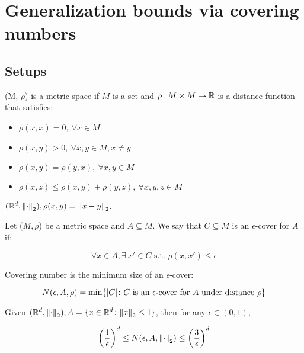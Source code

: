 
\chapter{Generalization bounds via covering numbers}


\section{Setups}

\begin{definition} 

    (M, \(\rho\)) is a metric space if \(M\) is a set and \(\rho \colon M \times M \to \mathbb{R}\)
    is a distance function that satisfies: 

    \begin{itemize}
        \item \(\rho (x, x) = 0, \ \forall x \in M\). 
        \item \(\rho (x, y) > 0, \ \forall x, y \in M, x \neq y\)
        \item \(\rho (x, y) = \rho (y, x), \ \forall x,y \in M\)
        \item \(\rho (x, z) \leq \rho(x, y) + \rho (y, z), \ \forall x, y, z \in M\)
    \end{itemize}
    
\end{definition}

\begin{eg}
    \((\mathbb{R}^d, \norm{\cdot}_2), \rho (x, y) = \norm{x - y}_2\). 
\end{eg}


\begin{definition}
    Let (\(M, \rho\)) be a metric space and \(A \subseteq M\). We say that \(C \subseteq M\)
    is an \(\epsilon\)-cover for \(A\) if: 
    
    \[
        \forall x \in A, \exists \ x' \in C \text{ s.t. } \rho(x, x') \leq \epsilon  
    \]
\end{definition}


\begin{definition}
    Covering number is the minimum size of an \(\epsilon\)-cover: 
    
    \[
        N (\epsilon, A, \rho) = \min \{ \lvert C \rvert \colon C \text{ is an } \epsilon \text{-cover 
        for } A \text{ under distance } \rho  \}  
    \]
\end{definition}


\begin{eg}
    Given \((\mathbb{R}^d, \norm{\cdot}_2), A = \{  x \in \mathbb{R}^d \colon \norm{x}_2 \leq 1 \}\),  
    then for any \(\epsilon \in (0, 1)\), 

    \[
        \left( \frac{1}{\epsilon}\right)^d \leq N ( \epsilon, A, \norm{\cdot}_2) \leq 
        \left(\frac{3}{\epsilon}\right)^d   
    \]
\end{eg}

